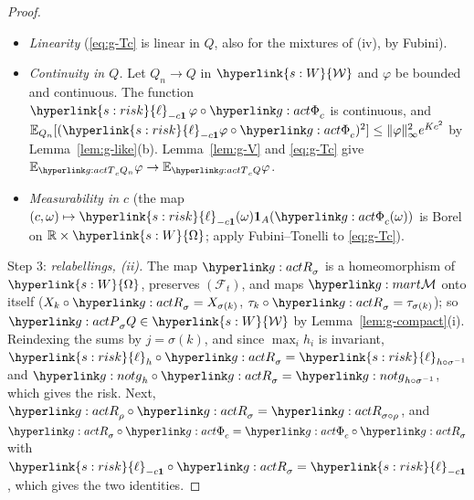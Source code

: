 \documentclass[11pt]{article}
\DeclareRobustCommand{\sy}[2]{{\hyperlink{#1}{#2}}}
\newcommand{\R}{\mathbb{R}}
\newcommand{\E}{\mathbb{E}}
\newcommand{\1}{\mathbf{1}}
\newcommand{\Wc}{\sy{s:W}{\mathcal W}}
\newcommand{\Om}{\sy{s:W}{\Omega}}
\newcommand{\lh}{\sy{s:risk}{\ell}}
\begin{document}
\begin{proof}
\begin{itemize}
\begin{align*}
\end{align*}
using also $\gPhi_a\circ\gPhi_c=\gPhi_{a+c}$. Clearly $\gTc_0=\mathrm{id}$.
\item \emph{Linearity} (\eqref{eq:g-Tc} is linear in $Q$, also for the mixtures of (iv), by Fubini).
\item \emph{Continuity in $Q$.} Let $Q_n\to Q$ in $\Wc$ and $\varphi$ be bounded and continuous. The function $\lh_{-c\1}\,\varphi\circ\gPhi_c$ is continuous, and
$\E_{Q_n}[(\lh_{-c\1}\varphi\circ\gPhi_c)^2]\le\|\varphi\|_\infty^2e^{Kc^2}$ by Lemma~\ref{lem:g-like}(b). Lemma~\ref{lem:g-V} and \eqref{eq:g-Tc} give $\E_{\gTc_cQ_n}\varphi\to\E_{\gTc_cQ}\varphi$.
\item \emph{Measurability in $c$} (the map $(c,\omega)\mapsto\lh_{-c\1}(\omega)\1_A(\gPhi_c(\omega))$ is Borel on $\R\times\Om$; apply Fubini--Tonelli to \eqref{eq:g-Tc}).
\end{itemize}

Step 3: \emph{relabellings, (ii).} The map $\gRs_\sigma$ is a homeomorphism of $\Om$, preserves $(\mathcal F_t)$, and maps $\gMc$ onto itself ($X_k\circ\gRs_\sigma=X_{\sigma(k)}$,
$\tau_k\circ\gRs_\sigma=\tau_{\sigma(k)}$); so $\gPs_\sigma Q\in\Wc$ by Lemma~\ref{lem:g-compact}(i). Reindexing the sums by $j=\sigma(k)$, and since $\max_ih_i$ is invariant,
$\lh_h\circ\gRs_\sigma=\lh_{h\circ\sigma^{-1}}$ and $\ggh_h\circ\gRs_\sigma=\ggh_{h\circ\sigma^{-1}}$, which gives the risk. Next, $\gRs_\rho\circ\gRs_\sigma=\gRs_{\sigma\circ\rho}$, and
$\gRs_\sigma\circ\gPhi_c=\gPhi_c\circ\gRs_\sigma$ with $\lh_{-c\1}\circ\gRs_\sigma=\lh_{-c\1}$, which gives the two identities.


\end{proof}
\end{document}
